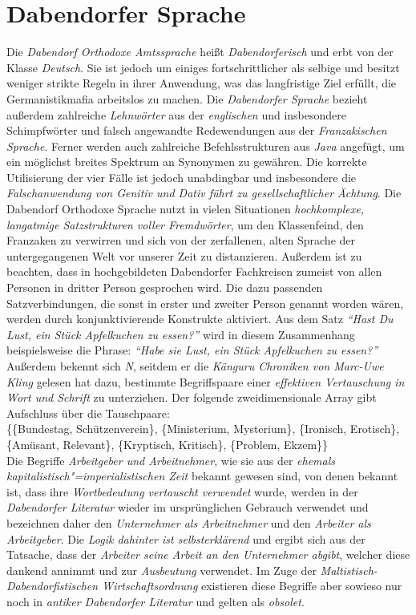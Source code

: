 \section{{Dabendorfer Sprache}}
Die \textit{Dabendorf Orthodoxe Amtssprache} heißt \textit{Dabendorferisch} und erbt von der Klasse \textit{Deutsch}. Sie ist jedoch um einiges fortschrittlicher als selbige und besitzt weniger strikte Regeln in ihrer Anwendung, was das langfristige Ziel erfüllt, die Germanistikmafia arbeitslos zu machen. Die \textit{Dabendorfer Sprache} bezieht außerdem zahlreiche \textit{Lehnwörter} aus der \textit{englischen} und insbesondere Schimpfwörter und falsch angewandte Redewendungen aus der \textit{Franzakischen Sprache}. Ferner werden auch zahlreiche Befehlsstrukturen aus \textit{Java} angefügt, um ein möglichst breites Spektrum an Synonymen zu gewähren. Die korrekte Utilisierung der vier Fälle ist jedoch unabdingbar und insbesondere die \textit{Falschanwendung von Genitiv und Dativ führt zu gesellschaftlicher Ächtung}. Die Dabendorf Orthodoxe Sprache nutzt in vielen Situationen \textit{hochkomplexe, langatmige Satzstrukturen voller Fremdwörter}, um den Klassenfeind, den Franzaken zu verwirren und sich von der zerfallenen, alten Sprache der untergegangenen Welt vor unserer Zeit zu distanzieren. Außerdem ist zu beachten, dass in hochgebildeten Dabendorfer Fachkreisen zumeist von allen Personen in dritter Person gesprochen wird. Die dazu passenden Satzverbindungen, die sonst in erster und zweiter Person genannt worden wären, werden durch konjunktivierende Konstrukte aktiviert. Aus dem Satz \textit{\enquote{Hast Du Lust, ein Stück Apfelkuchen zu essen?}} wird in diesem Zusammenhang beispielsweise die Phrase: \textit{\enquote{Habe sie Lust, ein Stück Apfelkuchen zu essen?}}\\
Außerdem bekennt sich \textit{N}, seitdem er die \textit{Känguru Chroniken von Marc-Uwe Kling} gelesen hat dazu, bestimmte Begriffspaare einer \textit{effektiven Vertauschung in Wort und Schrift} zu unterziehen. Der folgende zweidimensionale Array gibt Aufschluss über die Tauschpaare:\\
\{\{Bundestag, Schützenverein\}, \{Ministerium, Mysterium\}, \{Ironisch, Erotisch\},\\\{Amüsant, Relevant\}, \{Kryptisch, Kritisch\}, \{Problem, Ekzem\}\}\\
Die Begriffe \textit{Arbeitgeber und Arbeitnehmer}, wie sie aus der \textit{ehemals kapitalistisch"=imperialistischen Zeit} bekannt gewesen sind, von denen bekannt ist, dass ihre \textit{Wortbedeutung vertauscht verwendet} wurde, werden in der \textit{Dabendorfer Literatur} wieder im ursprünglichen Gebrauch verwendet und bezeichnen daher den \textit{Unternehmer als Arbeitnehmer} und den \textit{Arbeiter als Arbeitgeber}. Die \textit{Logik dahinter ist selbsterklärend} und ergibt sich aus der Tatsache, dass der \textit{Arbeiter seine Arbeit an den Unternehmer abgibt}, welcher diese dankend annimmt und zur \textit{Ausbeutung} verwendet. Im Zuge der \textit{Maltistisch-Dabendorfistischen Wirtschaftsordnung} existieren diese Begriffe aber sowieso nur noch in \textit{antiker Dabendorfer Literatur} und gelten als \textit{obsolet}.\\
